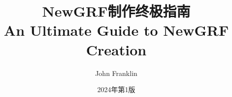 \documentclass[a4paper,11pt,oneside]{book}
\begin{document}
	\title{\Huge{NewGRF制作终极指南\\}\LARGE{An Ultimate Guide to NewGRF Creation\\}}
	\author{\Large {John Franklin}}
	\date{\Large {2024年第1版}}
	\frontmatter
	\maketitle
	\tableofcontents
	
	\mainmatter
	
	
	
	
	
	
	\backmatter
	\setcounter{chapter}{6}
	\setcounter{section}{0}
	
\end{document}
